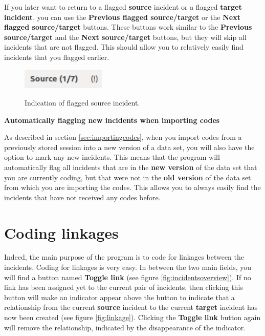 \documentclass{memoir}
\begin{document}
If you later want to return to a flagged \textbf{source} incident or a flagged \textbf{target incident}, you can use the \textbf{Previous flagged source/target} or the \textbf{Next flagged source/target} buttons. These buttons work similar to the \textbf{Previous source/target} and the \textbf{Next source/target} buttons, but they will skip all incidents that are not flagged. This should allow you to relatively easily find incidents that you flagged earlier.

\begin{figure}[h!]
  \centering
  \caption{Indication of flagged source incident.}
  \includegraphics[width=40mm]{Screenshot_9.pdf}
  \label{fig:flaggedincident}
\end{figure}


\begin{framed}
\textbf{Automatically flagging new incidents when importing codes}
  
  As described in section \ref{sec:importingcodes}, when you import codes from a previously stored session into a new version of a data set, you will also have the option to mark any new incidents. This means that the program will automatically flag all incidents that are in the \textbf{new version} of the data set that you are currently coding, but that were not in the \textbf{old version} of the data set from which you are importing the codes. This allows you to always easily find the incidents that have not received any codes before. 
\end{framed}


\section{Coding linkages}
\label{sec:codinglinkages}

Indeed, the main purpose of the program is to code for linkages between the incidents. Coding for linkages is very easy. In between the two main fields, you will find a button named \textbf{Toggle link} (see figure \ref{fig:incidentsoverview}). If no link has been assigned yet to the current pair of incidents, then clicking this button will make an indicator appear above the button to indicate that a relationship from the current \textbf{source} incident to the current \textbf{target} incident has now been created (see figure \ref{fig:linkage}). Clicking the \textbf{Toggle link} button again will remove the relationship, indicated by the disappearance of the indicator.
\end{document}
